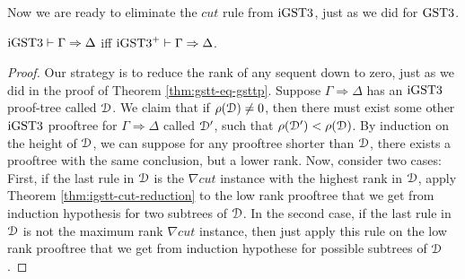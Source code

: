 \documentclass[10pt,a4paper]{amsart}
\begin{document}
Now we are ready to eliminate the $cut$ rule from $\text{iGST3}$, just as we did for $\text{GST3}$.

\begin{thm}\label{thm:igstt-eq-igsttp}
	$\text{iGST3} \vdash \Gamma \Rightarrow \Delta$ iff $\text{iGST3}^+ \vdash \Gamma \Rightarrow \Delta$.
\end{thm}
\begin{proof}
  Our strategy is to reduce the rank of any sequent down to zero, just as we did in the proof of Theorem \ref{thm:gstt-eq-gsttp}.
  Suppose $\Gamma \Rightarrow \Delta$ has an $\text{iGST3}$ proof-tree called $\mathcal{D}$. We claim that if $\rho(\mathcal{D}) \neq 0$, then there must exist some other $\text{iGST3}$ prooftree for $\Gamma \Rightarrow \Delta$ called $\mathcal{D}'$, such that $\rho(\mathcal{D}') < \rho(\mathcal{D})$. By induction on the height of $\mathcal{D}$, we can suppose for any prooftree shorter than $\mathcal{D}$, there exists a prooftree with the same conclusion, but a lower rank. Now, consider two cases: First, if the last rule in $\mathcal{D}$ is the $\nabla cut$ instance with the highest rank in $\mathcal{D}$, apply Theorem \ref{thm:igstt-cut-reduction} to the low rank prooftree that we get from induction hypothesis for two subtrees of $\mathcal{D}$. In the second case, if the last rule in $\mathcal{D}$ is not the maximum rank $\nabla cut$ instance, then just apply this rule on the low rank prooftree that we get from induction hypothese for possible subtrees of $\mathcal{D}$.
\end{proof}



% 

% 

% 


% 
\end{document}
